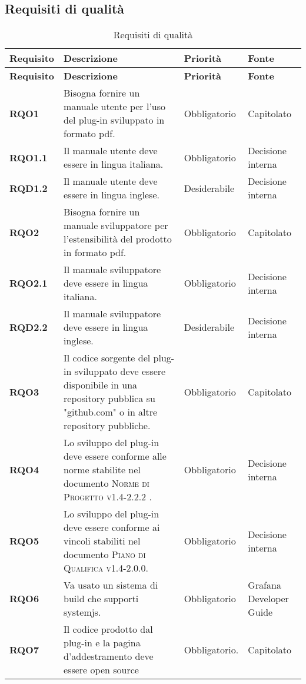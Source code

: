 \subsection{Requisiti di qualità}
\label{sub:requisiti_di_qualita}

\renewcommand{\arraystretch}{2} %
\begin{longtable}[H]{>{\centering\bfseries}m{2cm} >{\centering}m{9cm} >{\centering}m{2.5cm} >{\centering\arraybackslash}m{2.5cm}}
  \caption{Requisiti di qualità}%
  \label{tab:requisiti_di_qualità}                                                    \\
  \rowcolor{lightgray}
  {\textbf{Requisito}} & {\textbf{Descrizione}} & {\textbf{Priorità}} & {\textbf{Fonte}}  \\
  \endfirsthead%
  \rowcolor{lightgray}
  {\textbf{Requisito}} & {\textbf{Descrizione}} & {\textbf{Priorità}} & {\textbf{Fonte}}  \\
  \endhead%
  \rowcolor{white}
  \multicolumn{4}{c}{\textit{Continua alla pagina successiva}}
  \endfoot%
  \endlastfoot%
  \textbf{RQO1} & Bisogna fornire un manuale utente per l'uso del plug-in sviluppato in formato pdf. & Obbligatorio & Capitolato \\
  \textbf{RQO1.1} & Il manuale utente deve essere in lingua italiana. & Obbligatorio & Decisione interna \\
  \textbf{RQD1.2} & Il manuale utente deve essere in lingua inglese. & Desiderabile & Decisione interna \\
  \textbf{RQO2} & Bisogna fornire un manuale sviluppatore per l'estensibilità del prodotto in formato pdf. & Obbligatorio & Capitolato \\
  \textbf{RQO2.1} & Il manuale sviluppatore deve essere in lingua italiana. & Obbligatorio & Decisione interna \\
  \textbf{RQD2.2} & Il manuale sviluppatore deve essere in lingua inglese. & Desiderabile & Decisione interna \\
  \textbf{RQO3} & Il codice sorgente del plug-in sviluppato deve essere disponibile in una repository pubblica su "github.com" o in altre repository pubbliche. & Obbligatorio & Capitolato \\
  \textbf{RQO4} & Lo sviluppo del plug-in deve essere conforme alle norme stabilite nel documento \textsc{Norme di Progetto v1.4-2.2.2} . & Obbligatorio & Decisione interna \\
  \textbf{RQO5} & Lo sviluppo del plug-in deve essere conforme ai vincoli stabiliti nel documento \textsc{Piano di Qualifica v1.4-2.0.0}. & Obbligatorio & Decisione interna \\
  \textbf{RQO6} & Va usato un sistema di build che supporti systemjs. & Obbligatorio & Grafana Developer Guide \\
  \textbf{RQO7} & Il codice prodotto dal plug-in e la pagina d'addestramento deve essere open source & Obbligatorio. & Capitolato \\
\end{longtable}
